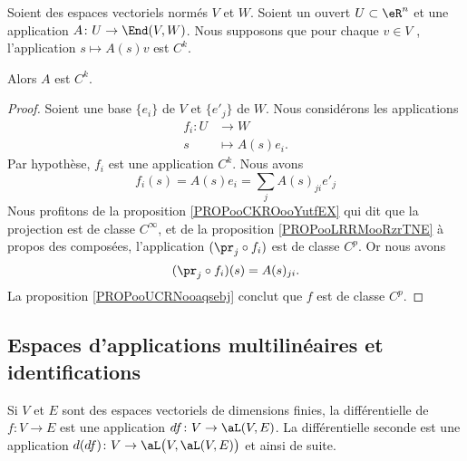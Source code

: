 \begin{proposition}		\label{PROPooYORGooDmwrJg}
	Soient des espaces vectoriels normés \( V\) et \( W\). Soient un ouvert \( U\subset \eR^n\) et une application \(A \colon U\to \End(V,W)  \). Nous supposons que pour chaque \( v\in V\) , l'application \( s\mapsto A(s)v\) est \( C^k\).

	Alors \( A\) est \( C^k\).
\end{proposition}

\begin{proof}
	Soient une base \( \{ e_i \}\) de \( V\) et \( \{ e'_j \}\) de \( W\). Nous considérons les applications
	\begin{equation}
		\begin{aligned}
			f_i\colon U & \to W            \\
			s           & \mapsto A(s)e_i.
		\end{aligned}
	\end{equation}
	Par hypothèse, \( f_i\) est une application \( C^k\). Nous avons
	\begin{equation}
		f_i(s)=A(s)e_i=\sum_jA(s)_{ji}e'_j
	\end{equation}
	Nous profitons de la proposition \ref{PROPooCKROooYutfEX} qui dit que la projection est de classe \( C^{\infty}\), et de la proposition \ref{PROPooLRRMooRzrTNE} à propos des composées, l'application \( (\pr_j\circ f_i)\) est de classe \( C^p\). Or nous avons
	\begin{equation}
		(\pr_j\circ f_i)(s)=A(s)_{ji}.
	\end{equation}
	La proposition \ref{PROPooUCRNooaqsebj} conclut que \( f\) est de classe \( C^p\).
\end{proof}

\subsection{Espaces d'applications multilinéaires et identifications}

Si \( V\) et \( E\) sont des espaces vectoriels de dimensions finies, la différentielle de \( f\colon V\to E\) est une application \( df\colon V\to \aL(V,E)\). La différentielle seconde est une application \( d(df)\colon V\to \aL\big( V,\aL(V,E) \big)\) et ainsi de suite.

